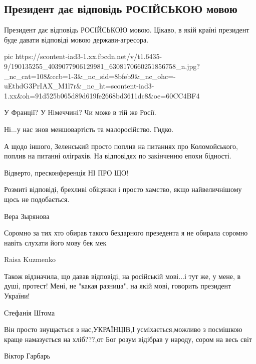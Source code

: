  
 
 
 
 
\subsection{Президент дає відповідь РОСІЙСЬКОЮ мовою}

Президент дає відповідь РОСІЙСЬКОЮ мовою. Цікаво, в якій країні президент буде
давати відповіді мовою держави-агресора. 

\ifcmt
  pic https://scontent-iad3-1.xx.fbcdn.net/v/t1.6435-9/190135255_4039077906129981_6308170660251856758_n.jpg?_nc_cat=108&ccb=1-3&_nc_sid=8bfeb9&_nc_ohc=-uEthdG3PrIAX_M1l7r&_nc_ht=scontent-iad3-1.xx&oh=91d525b065d89d619fe2668bd3611dc8&oe=60CC4BF4
\fi

У Франції? У Німеччині? Чи може в тій же Росії. 

Ні...у нас знов меншовартість та малоросійство. Гидко.

А щодо іншого, Зеленський просто поплив на питаннях про Коломойського, поплив
на питанні оліграхів. На відповідях по закінченню епохи бідності. 

Відверто, пресконференція НІ ПРО ЩО! 

Розмиті відповіді, брехливі обіцянки і просто хамство, якщо найвеличнішому щось
не подобається.

Вера Зырянова

Соромно за тих хто обирав такого бездарного презедента я не обирала соромно
навіть слухати його мову бек мек

Raisa Kuzmenko

Також відзначила, що давав відповіді, на російській мові...і тут же, у мене, в
душі, протест! Мені, не "какая разница", на якій мові, говорить президент
України!

Стефанія Штома

Він просто знущається з нас,УКРАЇНЦІВ,І усміхається,можливо з посмішкою краще
намазується на хліб???,от Бог розум відібрав у народу, сором на весь світ

Віктор Гарбарь

